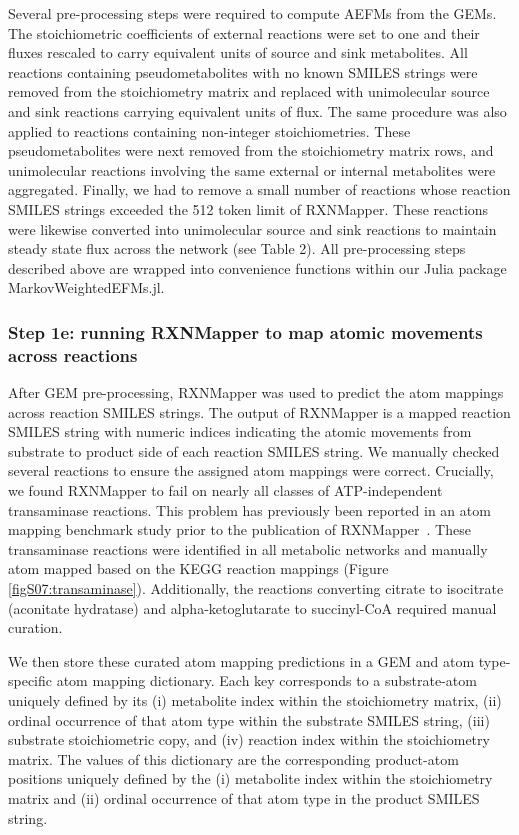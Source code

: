 \documentclass[12pt]{article}
\begin{document}
Several pre-processing steps were required to compute AEFMs from the GEMs.
The stoichiometric coefficients of external reactions were set to one and
their fluxes rescaled to carry equivalent units of source and sink
metabolites. All reactions containing pseudometabolites with no known
SMILES strings were removed from the stoichiometry matrix and replaced
with unimolecular source and sink reactions carrying equivalent units of
flux. The same procedure was also applied to reactions containing
non-integer stoichiometries. These pseudometabolites were next removed
from the stoichiometry matrix rows, and unimolecular reactions involving
the same external or internal metabolites were aggregated. Finally, we had
to remove a small number of reactions whose reaction SMILES strings
exceeded the 512 token limit of RXNMapper. These reactions were likewise
converted into unimolecular source and sink reactions to maintain steady
state flux across the network (see Table 2). All pre-processing steps
described above are wrapped into convenience functions within our Julia
package MarkovWeightedEFMs.jl.

\subsubsection*{Step 1e: running RXNMapper to map atomic movements across
reactions}

After GEM pre-processing, RXNMapper was used to predict the atom mappings
across reaction SMILES strings. The output of RXNMapper is a mapped
reaction SMILES string with numeric indices indicating the atomic
movements from substrate to product side of each reaction SMILES string.
We manually checked several reactions to ensure the assigned atom
mappings were correct. Crucially, we found RXNMapper to fail on nearly all
classes of ATP-independent transaminase reactions. This problem has
previously been reported in an atom mapping benchmark study prior to the
publication of RXNMapper~\citep{PreciatGonzalezGermanA.2017Ceoa}. These
transaminase reactions were identified in all metabolic networks and
manually atom mapped based on the KEGG reaction mappings (Figure
\ref{figS07:transaminase}). Additionally, the reactions converting citrate
to isocitrate (aconitate hydratase) and alpha-ketoglutarate to
succinyl-CoA required manual curation.

We then store these curated atom mapping predictions in a GEM and atom
type-specific atom mapping dictionary. Each key corresponds to
a substrate-atom uniquely defined by its (i) metabolite index within the
stoichiometry matrix, (ii) ordinal occurrence of that atom type within the
substrate SMILES string, (iii) substrate stoichiometric copy, and (iv)
reaction index within the stoichiometry matrix. The values of this
dictionary are the corresponding product-atom positions uniquely defined
by the (i) metabolite index within the stoichiometry matrix and (ii)
ordinal occurrence of that atom type in the product SMILES string.
\end{document}
